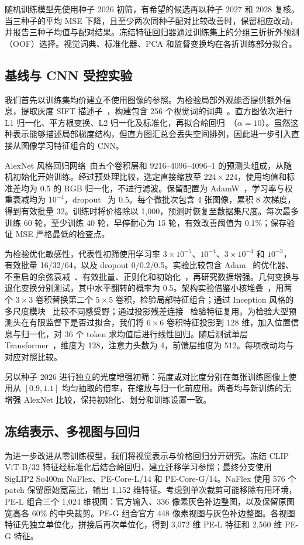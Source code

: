 \documentclass[conference,a4paper]{IEEEtran}
\begin{document}
随机训练模型先使用种子 2026 初筛，有希望的候选再以种子 2027 和 2028 复核。当三种子的平均 MSE 下降，且至少两次同种子配对比较改善时，保留相应改动，并报告三种子均值与配对结果。冻结特征回归器通过训练集上的分组三折折外预测（OOF）选择。视觉词典、标准化器、PCA 和监督变换均在各折训练部分拟合。

\subsection{基线与 CNN 受控实验}
我们首先以训练集均价建立不使用图像的参照。为检验局部外观能否提供额外信息，提取灰度 SIFT 描述子~\cite{sift1999,sift}，构建包含 256 个视觉词的词典~\cite{bovw}。直方图依次进行 L1 归一化、平方根变换、L2 归一化及标准化，再拟合岭回归~\cite{ridge}（$\alpha=10$）。虽然这种表示能够描述局部梯度结构，但直方图汇总会丢失空间排列，因此进一步引入直接从图像学习特征组合的 CNN。

AlexNet 风格回归网络~\cite{alexnet}由五个卷积层和 9216--4096--4096--1 的预测头组成，从随机初始化开始训练。经过预处理比较，选定直接缩放至 $224\times224$，使用均值和标准差均为 0.5 的 RGB 归一化，不进行滤波。保留配置为 AdamW~\cite{adamw}，学习率与权重衰减均为 $10^{-4}$，dropout~\cite{dropout2012,dropout} 为 0.5。每个微批次包含 4 张图像，累积 8 次梯度，得到有效批量 32。训练时将价格除以 1,000，预测时恢复至数据集尺度。每次最多训练 60 轮，至少训练 40 轮，早停耐心为 15 轮，有效改善阈值为 0.1\%；保存验证 MSE 严格最低的检查点。

为检验优化敏感性，代表性初筛使用学习率 $3\times10^{-5}$、$10^{-4}$、$3\times10^{-4}$ 和 $10^{-3}$，有效批量 16/32/64，以及 dropout 0/0.2/0.5。实验比较包含 Adam~\cite{adam} 的优化器、不重启的余弦衰减~\cite{sgdr}、有效批量、正则化和初始化~\cite{xavier,heinit}，再研究数据增强。几何变换与退化变换分别测试，其中水平翻转的概率为 0.5。架构实验借鉴小核堆叠~\cite{vgg}，用两个 $3\times3$ 卷积替换第二个 $5\times5$ 卷积，检验局部特征组合；通过 Inception 风格的多尺度模块~\cite{inception} 比较不同感受野；通过投影残差连接~\cite{resnet} 检验特征复用。为检验大型预测头在有限监督下是否过拟合，我们将 $6\times6$ 卷积特征投影到 128 维，加入位置信息与归一化，对 36 个 token 求均值后进行线性回归。随后测试单层 Transformer~\cite{transformer}，维度为 128，注意力头数为 4，前馈层维度为 512。每项改动均与对应对照比较。

另以种子 2026 进行独立的光度增强初筛：亮度或对比度分别在每张训练图像上使用从 $[0.9,1.1]$ 均匀抽取的倍率，在缩放与归一化前应用。两者均与新训练的无增强 AlexNet 比较，保持初始化、划分和训练设置一致。

\subsection{冻结表示、多视图与回归}
为进一步改进从零训练模型，我们将视觉表示与价格回归分开研究。冻结 CLIP ViT-B/32 特征经标准化后结合岭回归，建立迁移学习参照；最终分支使用 SigLIP2 So400m NaFlex、PE-Core-L/14 和 PE-Core-G/14。NaFlex 使用 576 个 patch 保留原始宽高比，输出 1,152 维特征。考虑到单次裁剪可能移除有用环境，PE-L 组合三个 1,024 维视图：官方输入、336 像素灰色补边整图，以及保留原图宽高各 60\% 的中央裁剪。PE-G 组合官方 448 像素视图与灰色补边整图。各视图特征先独立单位化，拼接后再次单位化，得到 3,072 维 PE-L 特征和 2,560 维 PE-G 特征。
\end{document}
